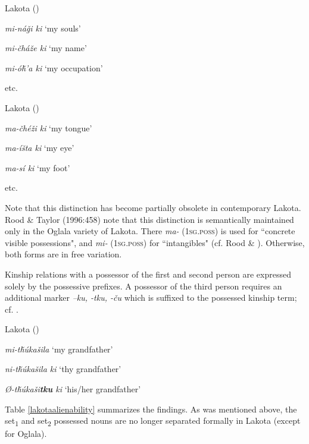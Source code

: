 \documentclass[output=paper]{LSP/langsci}
\begin{document}
\ea Lakota (\citealt[101]{Buechel1939}) \label{lakotaincorporeal}

\textit{mi-ná\v{g}i ki } \hspace{2.1em}		`my souls'

\textit{mi-\v{c}há\v{z}e  ki } \hspace{1.9em} `my name'

\textit{mi-ó\v{h}'a ki}	\hspace{2em}		`my occupation'

etc.

\ex Lakota (\citealt[100]{Buechel1939}) \label{lakotabody}

\textit{ma-\v{c}hé\v{z}i ki } \hspace{1.7em}	`my tongue'

\textit{ma-íšta ki }	 \hspace{2.1em}	`my eye'

\textit{ma-sí ki }		 \hspace{3em}	`my foot'

etc.
\z

Note that this distinction has become partially obsolete in contemporary Lakota. Rood \& Taylor (1996:458) note that this distinction is semantically maintained only in the Oglala variety of Lakota. There \textit{ma-} (\textsc{1sg.poss}) is used for ``concrete visible possessions", and \textit{mi-} (\textsc{1sg.poss}) for ``intangibles" (cf. Rood \& \citealt[458]{Taylor1996}). Otherwise, both forms are in free variation.

Kinship relations with a possessor of the first and second person are expressed solely by the possessive prefixes. A possessor of the third person requires an additional marker \textit{–ku, -tku, -\v{c}u} which is suffixed to the possessed kinship term; cf. .

\ea	Lakota (\citealt[102]{Buechel1939}) \label{lakotamygrandfather}

\textit{mi-t\v{h}\'ukašila} \hspace{3.6em}		`my grandfather'
 
\textit{ni-t\v{h}\'ukašila ki } \hspace{2.3em}	`thy grandfather'

\textit{Ø-t\v{h}\'ukaši\textbf{tku} ki }	\hspace{1.8em} `his/her grandfather'
\z

Table \ref{lakotaalienability} summarizes the findings. As was mentioned above, the set\textsubscript{1} and set\textsubscript{2} possessed nouns are no longer separated formally in Lakota (except for Oglala).
\end{document}
